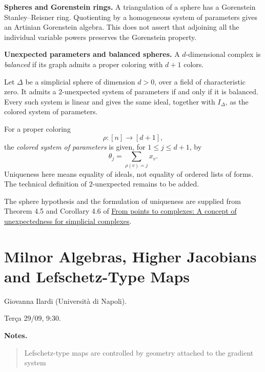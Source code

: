 \medskip\noindent
\textbf{Spheres and Gorenstein rings.}
A triangulation of a sphere has a
Gorenstein Stanley--Reisner ring.
Quotienting by a homogeneous system
of parameters gives an Artinian
Gorenstein algebra.
This does not assert that adjoining
all the individual variable powers
preserves the Gorenstein property.

\medskip\noindent
\textbf{Unexpected parameters and
balanced spheres.}
A $d$-dimensional complex is
\emph{balanced} if its graph admits
a proper coloring with $d+1$ colors.

\begin{theorem}[Holleben, 2026]
\label{theorem-holleben-balanced-sop}
Let $\Delta$ be a simplicial sphere
of dimension $d>0$, over a field
of characteristic zero.
It admits a $2$-unexpected system of
parameters if and only if it is balanced.
Every such system is linear and gives
the same ideal, together with
$I_\Delta$, as the colored system
of parameters.
\end{theorem}

For a proper coloring
$$
\rho:[n]\longrightarrow[d+1],
$$
the \emph{colored system of parameters}
is given, for $1\leq j\leq d+1$, by
$$
\theta_j=\sum_{\rho(v)=j}x_v.
$$
Uniqueness here means equality of ideals,
not equality of ordered lists of forms.
The technical definition of
$2$-unexpected remains to be added.

The sphere hypothesis and the formulation
of uniqueness are supplied from
Theorem 4.5 and Corollary 4.6 of
\href{%
https://arxiv.org/abs/2510.10884%
}{From points to complexes:
A concept of unexpectedness for
simplicial complexes}.

\section{Milnor Algebras, Higher Jacobians
and
Lefschetz-Type Maps}
\label{section-giovanna-ilardi}

Giovanna Ilardi (Università di Napoli).

Terça 29/09, 9:30.

\medskip\noindent
\textbf{Notes.}
\begin{quote}
Lefschetz-type maps are controlled by
geometry attached to the gradient system
\end{quote}

